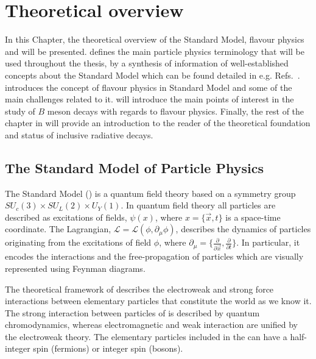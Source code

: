 \chapter{Theoretical overview}\label{ch:theory}

In this Chapter, the theoretical overview of the Standard Model, 
flavour physics and \BtoXsgamma will be presented.
 defines the main particle physics terminology that will be used throughout the thesis, by a synthesis of 
information of well-established concepts about the Standard Model which can be found detailed in e.g. Refs.~\cite{Peskin:1995ev,Thomson:2013zua,Griffiths:2008zz}.
 introduces the concept of flavour physics in Standard Model and some of the main challenges related to it.
 will introduce the main points of interest in the study of $B$ meson decays with regards to flavour physics.
Finally, the rest of the chapter in  will provide an introduction to the reader of the theoretical foundation and status of inclusive radiative decays.


\section{The Standard Model of Particle Physics} \label{sec:standard_model}

The Standard Model (\SM) is a quantum field theory based on a symmetry group \mbox{$SU_c(3)\times SU_L(2)\times U_Y(1)$}.
In quantum field theory all particles are described as excitations of fields, $\psi(x)$, 
where $x=\{\vec{x},t\}$ is a space-time coordinate.
The Lagrangian, $\mathcal{L}=\mathcal{L}(\phi,\partial_{\mu}\phi)$, describes the dynamics of particles originating from the excitations of field $\phi$,
where $\partial_{\mu}=\{\frac{\partial}{\partial \vec{x}},\frac{\partial}{\partial t}\}$.
In particular, it encodes the interactions and the free-propagation of particles which are visually represented using Feynman diagrams.

The theoretical framework of \SM describes the electroweak and strong force interactions between elementary particles that constitute the world as we know it.
The strong interaction between particles of \SM is described by quantum chromodynamics, 
whereas electromagnetic and weak interaction are unified by the electroweak theory.
The elementary particles included in the \SM can have a half-integer spin (fermions) or integer spin (bosons).

